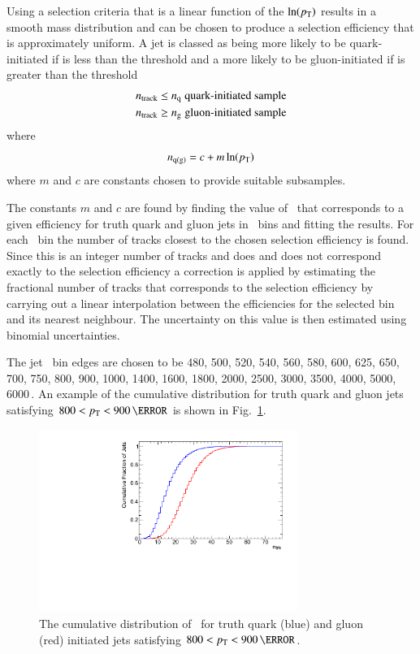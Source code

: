 Using a selection criteria that is a linear function of the \( \ln(p_{\mathrm T}) \) 
results in a smooth mass distribution and can be chosen to produce a  
selection efficiency that is approximately uniform. 
A jet is classed as being more likely to be quark-initiated if \ntrk is less than
the threshold \nq and a more likely to be gluon-initiated if \ntrk is 
greater than the threshold \ngluon  
\begin{align}
n_{\textrm{track}} & \le n_{\textrm{q}} \; \mbox{quark-initiated sample} \label{eq:QGselect} \\
n_{\textrm{track}}	  & \ge n_{\textrm{g}} \; \mbox{gluon-initiated sample} \nonumber
\end{align}
where   
\begin{equation}
n_{\mathrm{q(g)}} = {c + m \ln(p_{\mathrm T})}  \label{eq:nqg2}
\end{equation}
where $m$ and $c$ are constants chosen to provide suitable subsamples.

The constants $m$ and $c$ are found by finding the value of \ntrk\ 
that corresponds to a given efficiency for truth quark and gluon jets in 
\pT\ bins and fitting the results. For each \pT\ bin the number of tracks 
closest to the chosen selection efficiency is found. Since this is an integer 
number of tracks and does and does not correspond exactly to the selection efficiency 
a correction is applied by estimating the fractional number of tracks that corresponds 
to the selection  efficiency  by carrying out a linear interpolation between the efficiencies 
for the selected bin and its nearest neighbour. The uncertainty on this value is then estimated using 
binomial uncertainties. 


The jet \pT\ bin edges are chosen to be 
480, 500, 520, 540, 560, 580, 600, 625, 650, 700, 750, 800, 900, 1000, 1400, 
1600, 1800, 2000, 2500, 3000, 3500, 4000, 5000, 6000\,\GeV. An example of the \ntrk cumulative 
distribution for truth quark and gluon jets satisfying $800 < \pT < 900\,\GeV$ is shown in
Fig.~\ref{fig:ntrk_cumulative}.


\begin{figure}[htb]
 \centering
\includegraphics[width=0.75\textwidth]{figures/tagging/Cumulative_ntrk_distribution_12_800_900GeV.pdf}
\caption{The cumulative distribution of \ntrk\ for truth quark (blue) and gluon (red) initiated jets 
satisfying $800 < \pT < 900\,\GeV$.  \label{fig:ntrk_cumulative}}
\end{figure}


